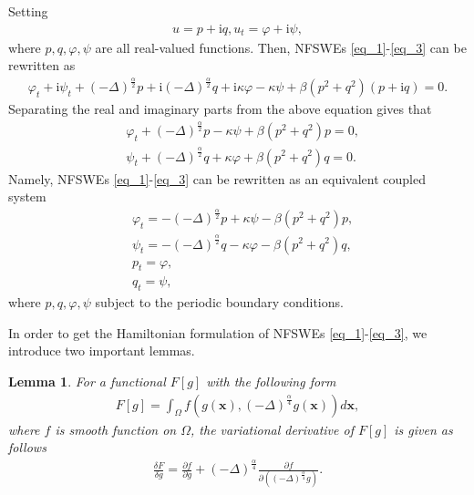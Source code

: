 \documentclass[preprint,compress,3p,10pt,fleqn]{elsarticle}
\numberwithin{equation}{section}
\newtheorem{lemma}[theorem]{Lemma}
\begin{document}
Setting
\begin{align}
u = p+\mathrm{i}q, u_t = \varphi+ \mathrm{i}\psi,
\end{align}
where $p, q,\varphi,\psi$ are all real-valued functions. Then, NFSWEs \eqref{eq_1}-\eqref{eq_3} can be rewritten as
\begin{align}\label{eq_28}
\varphi_{t}+\mathrm{i}\psi_{t}+\left( -\Delta \right) ^{\frac{\alpha }{2}}p+\mathrm{i}\left( -\Delta \right) ^{\frac{\alpha }{2}}q+\mathrm{i}\kappa \varphi-\kappa \psi+\beta \left( p^{2}+q^{2}\right) \left( p+\mathrm{i} q\right) =0.
\end{align}
Separating the real and imaginary parts from the above equation gives that
\begin{align}
&\varphi_{t}+\left( -\Delta \right) ^{\frac{\alpha }{2}}p-\kappa \psi+\beta \left( p^{2}+q^{2}\right)p=0,\nonumber\\
&\psi_{t}+\left( -\Delta \right) ^{\frac{\alpha }{2}}q+\kappa \varphi+\beta \left( p^{2}+q^{2}\right)q=0.\label{eq_29}
\end{align}
Namely, NFSWEs \eqref{eq_1}-\eqref{eq_3} can be rewritten as an equivalent coupled system
\begin{align}
&\varphi_{t}=-\left( -\Delta \right) ^{\frac{\alpha }{2}}p+\kappa \psi-\beta \left( p^{2}+q^{2}\right)p\label{eq_30},\\
&\psi_{t}=-\left( -\Delta \right) ^{\frac{\alpha }{2}}q-\kappa \varphi-\beta \left( p^{2}+q^{2}\right)q\label{eq_31},\\
&p_t=\varphi, \label{eq_32}\\
&q_t=\psi, \label{eq_33}
\end{align}
where $p, q,\varphi,\psi$ subject to the periodic boundary conditions.

In order to get the Hamiltonian formulation of NFSWEs \eqref{eq_1}-\eqref{eq_3}, we introduce two important lemmas.

\begin{lemma}\label{lem2}
 \cite{wangStructurepreservingNumericalMethods2018} For a functional $F[g]$ with the following form
\begin{align}\label{eq_25}
F[g]=\int_{\Omega} f\left(g(\boldsymbol{x}),(-\Delta)^{\frac{\alpha}{4}} g(\boldsymbol{x})\right) d \boldsymbol{x},
\end{align}
where $f$ is smooth function on $\Omega$, the variational derivative of $F[g]$ is given as follows
\begin{align}\label{eq_26}
\frac{\delta F}{\delta g}=\frac{\partial f}{\partial g}+(-\Delta)^{\frac{\alpha}{4}} \frac{\partial f}{\partial\left((-\Delta)^{\frac{\alpha}{4}} g\right)} .
\end{align}
\end{lemma}
\end{document}
